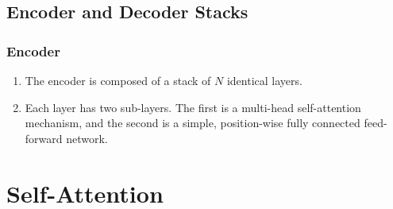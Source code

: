 \subsection{Encoder and Decoder Stacks}

\subsubsection*{Encoder}

\begin{enumerate}
    \item The encoder is composed of a stack of $N$ identical layers.

    \item Each layer has two sub-layers. 
    The first is a multi-head self-attention mechanism, and 
    the second is a simple, position-wise fully connected feed-forward network.
\end{enumerate}











\section{Self-Attention}

